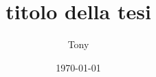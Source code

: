 \documentclass{book}
\title{titolo della tesi}
\author{Tony}
\date{\today}
\begin{document}
\maketitle

\tableofcontents











\nocite {Abraham1978,Bar2010,Jost2005}

	
	
\end{document}
